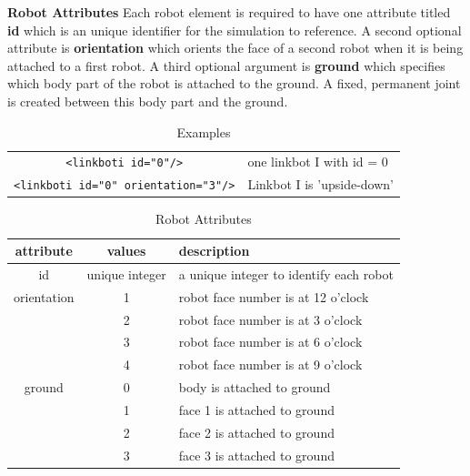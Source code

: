 \documentclass{article}
\begin{document}
\noindent
\newline
\textbf{Robot Attributes}
\newline
Each robot element is required to have one attribute titled \textbf{id} which is
an unique identifier for the simulation to reference.  A second optional
attribute is \textbf{orientation} which orients the face of a second robot when
it is being attached to a first robot.  A third optional argument is
\textbf{ground} which specifies which body part of the robot is attached to the
ground.  A fixed, permanent joint is created between this body part and the
ground.

\begin{table}[H]
	\begin{center}
	\begin{tabular}{c | l}
		\hline \hline
		\verb|<linkboti id="0"/>| & one linkbot I with id = 0 \\
		\verb|<linkboti id="0" orientation="3"/>| & Linkbot I is 'upside-down' \\
		\hline \hline
	\end{tabular}
	\caption{Examples}
	\label{tab:ex}
	\end{center}
\end{table}

\begin{table}[H]
	\begin{center}
	\begin{tabular}{c | c | l}
		\hline \hline
		\textbf{attribute} & \textbf{values} & \textbf{description} \\ \hline
		id & unique integer & a unique integer to identify each robot \\
		orientation & 1 & robot face number is at 12 o'clock \\
		 & 2 & robot face number is at 3 o'clock \\
		 & 3 & robot face number is at 6 o'clock \\
		 & 4 & robot face number is at 9 o'clock \\
		ground & 0 & body is attached to ground \\
		 & 1 & face 1 is attached to ground \\
		 & 2 & face 2 is attached to ground \\
		 & 3 & face 3 is attached to ground \\
		\hline \hline
	\end{tabular}
	\caption{Robot Attributes}
	\label{tab:attributes}
	\end{center}
\end{table}
\end{document}
